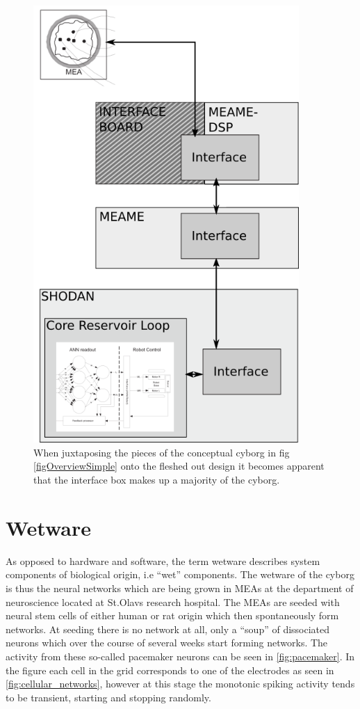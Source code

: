 \begin{figure}[h]
  \centering
  \includegraphics[width=0.9\textwidth]{fig/ConceptMap.png}
  \caption{
    When juxtaposing the pieces of the conceptual cyborg in fig
    \ref{figOverviewSimple} onto the fleshed out design it becomes apparent that the
    interface box makes up a majority of the cyborg.
  }
  \label{figJuxta}
\end{figure}
\section{Wetware}
As opposed to hardware and software, the term wetware describes system
components of biological origin, i.e ``wet'' components.
The wetware of the cyborg is thus the neural networks which are being grown in
MEAs at the department of neuroscience located at St.Olavs research hospital.
The MEAs are seeded with neural stem cells of either human or rat origin which
then spontaneously form networks.
At seeding there is no network at all, only a ``soup'' of dissociated
neurons which over the course of several weeks start forming networks.
The activity from these so-called pacemaker neurons can be seen in
\ref{fig:pacemaker}.
In the figure each cell in the grid corresponds to one of the
electrodes as seen in \ref{fig:cellular_networks}, however at this stage the
monotonic spiking activity tends to be transient, starting and stopping
randomly.
